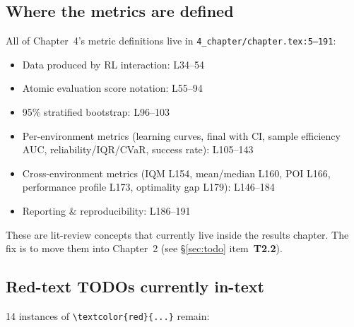 \documentclass[11pt,a4paper]{article}
\newcommand{\fileline}[1]{\texttt{\small #1}}
\begin{document}
\subsection*{Where the metrics are defined}

All of Chapter~4's metric definitions live in
\fileline{4\_chapter/chapter.tex:5--191}:
\begin{itemize}[leftmargin=*]
  \item Data produced by RL interaction: L34--54
  \item Atomic evaluation score notation: L55--94
  \item 95\% stratified bootstrap: L96--103
  \item Per-environment metrics (learning curves, final with CI, sample
  efficiency AUC, reliability/IQR/CVaR, success rate): L105--143
  \item Cross-environment metrics (IQM L154, mean/median L160, POI L166,
  performance profile L173, optimality gap L179): L146--184
  \item Reporting \& reproducibility: L186--191
\end{itemize}
These are lit-review concepts that currently live inside the results
chapter. The fix is to move them into Chapter~2 (see \S\ref{sec:todo}
item~\textbf{T2.2}).

\subsection*{Red-text TODOs currently in-text}

14 instances of \fileline{\textbackslash textcolor\{red\}\{...\}} remain:
\end{document}

